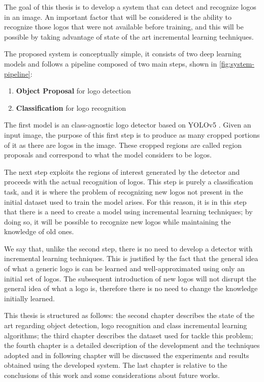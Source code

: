 The goal of this thesis is to develop a system that can detect and recognize logos in an image. An important factor that will be considered is the ability to recognize those logos that were not available before training, and this will be possible by taking advantage of state of the art incremental learning techniques.

The proposed system is conceptually simple, it consists of two deep learning models and follows a pipeline composed of two main steps, shown in \autoref{fig:system-pipeline}:

\begin{enumerate}
    \item \textbf{Object Proposal} for logo detection
    \item \textbf{Classification} for logo recognition
\end{enumerate}

The first model is an class-agnostic logo detector based on YOLOv5 \cite{glenn_jocher_2021_5563715}. Given an input image, the purpose of this first step is to produce as many cropped portions of it as there are logos in the image. These cropped regions are called region proposals and correspond to what the model considers to be logos.

The next step exploits the regions of interest generated by the detector and proceeds with the actual recognition of logos. This step is purely a classification task, and it is where the problem of recognizing new logos not present in the initial dataset used to train the model arises. For this reason, it is in this step that there is a need to create a model using incremental learning techniques; by doing so, it will be possible to recognize new logos while maintaining the knowledge of old ones.

We say that, unlike the second step, there is no need to develop a detector with incremental learning techniques. This is justified by the fact that the general idea of what a generic logo is can be learned and well-approximated using only an initial set of logos. The subsequent introduction of new logos will not disrupt the general idea of what a logo is, therefore there is no need to change the knowledge initially learned.

\vspace{1.5\baselineskip}
This thesis is structured as follows: the second chapter describes the state of the art regarding object detection, logo recognition and class incremental learning algorithms; the third chapter describes the dataset used for tackle this problem; the fourth chapter is a detailed description of the development and the techniques adopted and in following chapter will be discussed the experiments and results obtained using the developed system. The last chapter is relative to the conclusions of this work and some considerations about future works.